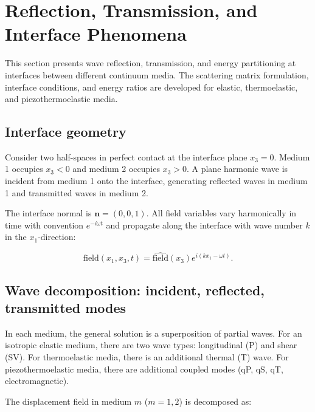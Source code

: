 \section{Reflection, Transmission, and Interface Phenomena}
\label{sec:interfaces}

This section presents wave reflection, transmission, and energy partitioning at interfaces between different continuum media. The scattering matrix formulation, interface conditions, and energy ratios are developed for elastic, thermoelastic, and piezothermoelastic media.

\subsection{Interface geometry}
\label{sec:9.1}

Consider two half-spaces in perfect contact at the interface plane $x_3 = 0$. Medium 1 occupies $x_3 < 0$ and medium 2 occupies $x_3 > 0$. A plane harmonic wave is incident from medium 1 onto the interface, generating reflected waves in medium 1 and transmitted waves in medium 2.

The interface normal is $\bm{n} = (0, 0, 1)$. All field variables vary harmonically in time with convention $e^{-i\omega t}$ and propagate along the interface with wave number $k$ in the $x_1$-direction:

\begin{equation}
\text{field}(x_1, x_3, t) = \hat{\text{field}}(x_3) e^{i(kx_1 - \omega t)}.
\label{eq:9.1}
\end{equation}

\subsection{Wave decomposition: incident, reflected, transmitted modes}
\label{sec:9.2}

In each medium, the general solution is a superposition of partial waves. For an isotropic elastic medium, there are two wave types: longitudinal (P) and shear (SV). For thermoelastic media, there is an additional thermal (T) wave. For piezothermoelastic media, there are additional coupled modes (qP, qS, qT, electromagnetic).

The displacement field in medium $m$ ($m = 1, 2$) is decomposed as:

